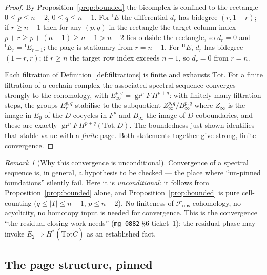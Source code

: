 \documentclass[11pt,oneside]{amsart}
\theoremstyle{plain}
\theoremstyle{definition}
\theoremstyle{remark}
\newtheorem{remark}[theorem]{Remark}
\theoremstyle{honeststyle}
\newcommand{\Tot}{\mathrm{Tot}}
\newcommand{\fobs}{\mathcal{F}_{\mathrm{obs}}}
\newcommand{\Ccheck}{\check{C}}
\DeclareMathOperator{\gr}{gr}
\begin{document}
\begin{proof}
By Proposition~\ref{prop:bounded} the bicomplex is confined to the
rectangle $0\le p\le n-2$, $0\le q\le n-1$. For ${}^{\mathrm{I}}E$ the
differential $d_{r}$ has bidegree $(r,1-r)$; if $r\ge n-1$ then for
any $(p,q)$ in the rectangle the target column index $p+r\ge p+(n-1)
\ge n-1>n-2$ lies outside the rectangle, so $d_{r}=0$ and
${}^{\mathrm{I}}E_{r}={}^{\mathrm{I}}E_{r+1}$; the page is stationary
from $r=n-1$. For ${}^{\mathrm{II}}E$, $d_{r}$ has bidegree $(1-r,r)$;
if $r\ge n$ the target row index exceeds $n-1$, so $d_{r}=0$ from
$r=n$.

Each filtration of Definition~\ref{def:filtrations} is finite and
exhausts $\Tot$. For a finite filtration of a cochain complex the
associated spectral sequence converges strongly to the cohomology,
with $E_{\infty}^{p,q}=\gr^{p}F\,H^{p+q}$: with finitely many filtration
steps, the groups $E_{r}^{p,q}$ stabilise to the subquotient
$Z_{\infty}^{p,q}/B_{\infty}^{p,q}$ where $Z_{\infty}$ is the image in
$E_{0}$ of the $D$-cocycles in $F^{p}$ and $B_{\infty}$ the image of
$D$-coboundaries, and these are exactly $\gr^{p}F\,H^{p+q}(\Tot,D)$.
The boundedness just shown identifies that stable value with a
\emph{finite} page. Both statements together give strong, finite
convergence.
\end{proof}

\begin{remark}[Why this convergence is unconditional]
\label{rem:conv-unconditional}
Convergence of a spectral sequence is, in general, a hypothesis to be
checked --- the place where ``un-pinned foundations'' silently fail.
Here it is \emph{unconditional}: it follows from
Proposition~\ref{prop:bounded} alone, and Proposition~\ref{prop:bounded}
is pure cell-counting ($q\le|T|\le n-1$, $p\le n-2$). No finiteness of
$\fobs$-cohomology, no acyclicity, no homotopy input is needed for
convergence. This is the convergence ``the residual-closing work
needs'' (\texttt{mg-0882} \S6 ticket~1): the residual phase may invoke
$E_{2}\Rightarrow H^{*}(\Tot\Ccheck)$ as an established fact.
\end{remark}

\subsection{The page structure, pinned}
\label{ssec:pages}
\end{document}
